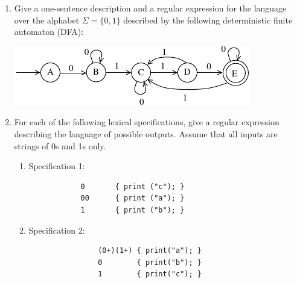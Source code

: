 \documentclass[11pt]{article}
\begin{document}
\begin{enumerate}
	\item Give a one-sentence description and a regular expression 
	      for the language over the alphabet $\Sigma = \{0,1\}$ described
	      by the following deterministic finite automaton (DFA):
	\begin{center}
		\includegraphics{wa1-q4.pdf}
	\end{center}
	
	\item For each of the following lexical specifications, give a regular expression 
		describing the language of possible outputs. Assume that all inputs are strings 
		of 0s and 1s only.
	\begin{enumerate}
		\item Specification 1:
			\begin{verbatim}
			0       { print ("c"); }
			00      { print ("a"); }
			1       { print ("b"); }
			\end{verbatim}
			
		\item Specification 2:
			\begin{verbatim}
				(0+)(1+) { print("a"); }
				0        { print("b"); }
				1        { print("c"); }
			\end{verbatim}
	\end{enumerate}
	
\end{enumerate}
\end{document}
